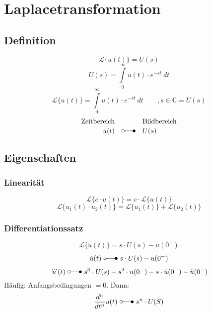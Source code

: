 



\chapter{Laplacetransformation}


\section{Definition}
\[ 
    \mathcal{L} \lbrace u(t) \rbrace = U(s)
\]
\[ 
    U(s) = \int\limits_{0}^{\infty} u(t) \cdot e^{-st} ~ dt 
\]
\[ 
    \mathcal{L} \lbrace u(t) \rbrace 
    = \int\limits_{0}^{\infty} u(t) \cdot e^{-st} ~ dt \qquad , s \in \mathbb{C} 
    = U(s) 
\]
\[ 
    \begin{array}{rcl}
        \text{Zeitbereich} &  & \text{Bildbereich} \\
        u(t) & \laplace & U(s)
    \end{array} 
\]

\section{Eigenschaften }


\subsection{Linearität}
\[ 
    \mathcal{L}\lbrace c \cdot u(t) \rbrace 
    = c \cdot \mathcal{L}\lbrace u(t) \rbrace 
\]
\[ 
    \mathcal{L}\lbrace u_1(t) \cdot u_2(t) \rbrace 
    = \mathcal{L}\lbrace u_1(t) \rbrace + \mathcal{L}\lbrace u_2(t) \rbrace 
\]

\subsection{Differentiationssatz}
\[ 
    \mathcal{L}\lbrace \dot{u}(t) \rbrace = s \cdot U(s) - u(0^-) 
\]
\[ 
    \dot{u}(t) ~ \laplace ~ s \cdot U(s) - u(0^-) 
\]
\[ 
    \dddot{u}(t) ~ \laplace ~ s^3 \cdot U(s) - s^2 \cdot u(0^-) 
    - s \cdot \dot{u}(0^-) - \ddot{u}(0^-) 
\]
Häufig: Anfangsbedingungen $= 0$.
Dann:
\[ 
    \frac{d^n}{dt^n} u(t) ~ \laplace ~ s^n \cdot U(S) 
\]

